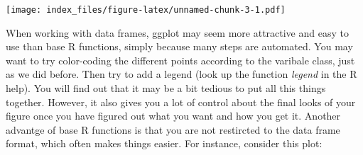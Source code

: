 \documentclass[]{article}
\newenvironment{Shaded}{\begin{snugshade}}{\end{snugshade}}
\newcommand{\DataTypeTok}[1]{\textcolor[rgb]{0.13,0.29,0.53}{#1}}
\newcommand{\DecValTok}[1]{\textcolor[rgb]{0.00,0.00,0.81}{#1}}
\newcommand{\KeywordTok}[1]{\textcolor[rgb]{0.13,0.29,0.53}{\textbf{#1}}}
\newcommand{\NormalTok}[1]{#1}
\newcommand{\OperatorTok}[1]{\textcolor[rgb]{0.81,0.36,0.00}{\textbf{#1}}}
\newcommand{\StringTok}[1]{\textcolor[rgb]{0.31,0.60,0.02}{#1}}
\begin{document}
\begin{Shaded}
\end{Shaded}

\texttt{[image: index\_files/figure-latex/unnamed-chunk-3-1.pdf]}

When working with data frames, ggplot may seem more attractive and easy
to use than base R functions, simply because many steps are automated.
You may want to try color-coding the different points according to the
varibale class, just as we did before. Then try to add a legend (look up
the function \emph{legend} in the R help). You will find out that it may
be a bit tedious to put all this things together. However, it also gives
you a lot of control about the final looks of your figure once you have
figured out what you want and how you get it. Another advantge of base R
functions is that you are not restircted to the data frame format, which
often makes things easier. For instance, consider this plot:
\end{document}
